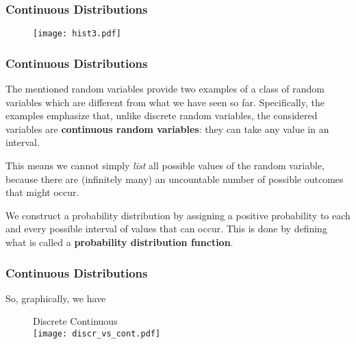 \documentclass[notes=show,smaller,handout]{beamer}\usepackage[]{graphicx}\usepackage[]{color}
\begin{document}
\begin{frame}%

\frametitle{Continuous Distributions}
\begin{example}[cont'd]
\begin{figure}
\texttt{[image: hist3.pdf]}
\end{figure}
\end{example}
\end{frame}


%
%
%


\begin{frame}%
\frametitle{Continuous Distributions}

The mentioned random variables provide two examples of a class of random variables which are different from what we have seen so far.
Specifically, the examples emphasize that,
unlike discrete random variables, the considered variables are \textbf{continuous random variables}:
they can take any value in an interval. \\ \vspace{0.6cm}

This means we cannot simply \emph{list} all possible values of the
random variable, because there are (infinitely many) an uncountable number of possible outcomes that might occur. \\ \vspace{0.6cm}


 We construct a probability distribution by assigning a positive probability to each and every possible interval of values that can occur. This is done by defining what is called a \textbf{probability distribution function}.

\end{frame}%


\begin{frame}%
\frametitle{Continuous Distributions}
So, graphically, we have \\ \vspace{0.5cm}
\begin{figure}
\hspace{1cm} Discrete \hspace{3cm} Continuous\\
\texttt{[image: discr\_vs\_cont.pdf]}
\end{figure}

\end{frame}%
\end{document}
